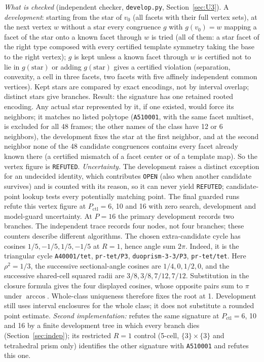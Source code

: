 \documentclass[11pt]{article}
\theoremstyle{definition}
\theoremstyle{remark}
\newcommand{\file}[1]{\path{#1}}
\begin{document}
\noindent\emph{What is checked} (independent checker,
\texttt{develop.py}, Section~\ref{sec:U3}). A \emph{development}:
starting from the star of $v_0$ (all facets with their full vertex sets),
at the next vertex $w$ without a star every congruence $g$ with
$g(v_0)=w$ mapping a facet of the star onto a known facet through $w$ is
tried (all of them: a star facet of the right type composed with every
certified template symmetry taking the base to the right vertex); $g$ is
kept unless a known facet through $w$ is certified not to lie in
$g(\text{star})$ or adding $g(\text{star})$ gives a certified violation
(separation, convexity, a cell in three facets, two facets with five
affinely independent common vertices). Kept stars are compared by exact
encodings, not by interval overlap; distinct stars give branches. Result:
the signature has one retained rooted encoding. Any actual star represented by it, if one
existed, would force its neighbors; it matches no listed
polytope (\texttt{A510001}, with the same facet multiset, is excluded for
all 48 frames; the other names of the class have 12 or 6 neighbors), the
development fixes the star at the first neighbor, and at the second
neighbor none of the 48 candidate congruences contains every facet already
known there (a certified mismatch of a facet center or of a template map).
So the vertex figure is \texttt{REFUTED}. \emph{Uncertainty.} The development raises a distinct exception for an undecided
identity, which contributes \texttt{OPEN} (also when another candidate
survives) and is counted with its reason, so it can never yield
\texttt{REFUTED}; candidate-point lookup tests every potentially matching point. The final guarded runs refute this
vertex figure at $P_{\mathrm{ctl}}=6$, 10 and 16 with zero search, development and
model-guard uncertainty. At $P=16$ the primary development records two
branches. The independent trace records four nodes, not four branches;
these counters describe different algorithms. The chosen extra-candidate
cycle has cosines $1/5,-1/5,1/5,-1/5$ at $R=1$, hence angle sum $2\pi$.
Indeed, it is the triangular cycle
\texttt{A40001/tet}, \texttt{pr-tet/P3},
\texttt{duoprism-3-3/P3}, \texttt{pr-tet/tet}.
Here $\rho^2=1/3$, the successive sectional-angle cosines are
$1/4,0,1/2,0$, and the successive shared-cell squared radii are
$3/8,3/8,7/12,7/12$. Substitution in the closure formula gives the four
displayed cosines, whose opposite pairs sum to $\pi$ under $\arccos$.
Whole-class uniqueness therefore fixes the root at 1. Development still
uses interval enclosures for the whole class; it does not substitute a
rounded point estimate.
\emph{Second implementation:} \file{checks/independent-s23/} refutes the same
signature at $P_{\mathrm{ctl}}=6$, 10 and 16 by a finite development tree in which
every branch dies (Section~\ref{sec:indep}); its restricted $R=1$ control
(5-cell, $\{3\}\times\{3\}$ and tetrahedral prism only) identifies the other
signature with \texttt{A510001} and refutes this one.
\end{document}
